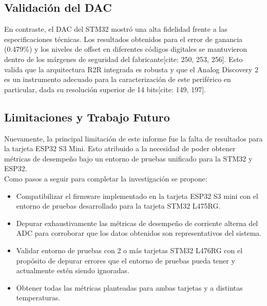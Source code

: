 \documentclass{article}
\begin{document}
\subsection{Validación del DAC}
En contraste, el DAC del STM32 mostró una alta fidelidad frente a las especificaciones técnicas. Los resultados obtenidos para el error de ganancia (0.479\%) y los niveles de offset en diferentes códigos digitales se mantuvieron dentro de los márgenes de seguridad del fabricante[cite: 250, 253, 256]. Esto valida que la arquitectura R2R integrada es robusta y que el Analog Discovery 2 es un instrumento adecuado para la caracterización de este periférico en particular, dada su resolución superior de 14 bits[cite: 149, 197].
\subsection{Limitaciones y Trabajo Futuro}
Nuevamente, la principal limitación de este informe fue la falta de resultados para la tarjeta ESP32 S3 Mini. Esto atribuido a la necesidad de poder obtener métricas de desempeño bajo un entorno de pruebas unificado para la STM32 y ESP32.
\\
Como pasos a seguir para completar la investigación se propone:
\begin{itemize}
    \item Compatibilizar el firmware implementado en la tarjeta ESP32 S3 mini con el entorno de pruebas desarrollado para la tarjeta STM32 L475RG.
    \item Depurar exhaustivamente las métricas de desempeño de corriente alterna del ADC para corroborar que los datos obtenidos son representativos del sistema.
    \item Validar entorno de pruebas con 2 o más tarjetas STM32 L476RG con el propósito de depurar errores que el entorno de pruebas pueda tener y actualmente estén siendo ignoradas.
    \item Obtener todas las métricas planteadas para ambas tarjetas y a distintas temperaturas.
\end{itemize}
\printbibliography
\end{document}
